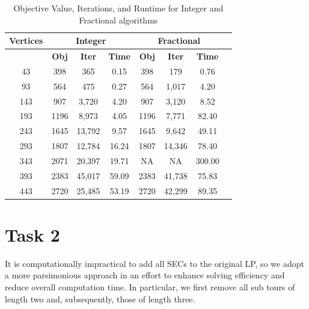 \documentclass[12pt]{article}
\numberwithin{equation}{section}
\begin{document}
\vspace{1em}
\begin{table}[!ht]
\centering
\begin{tabular}{|c|c|c|c|c|c|c|c|}
\hline
\textbf{Vertices} & \multicolumn{3}{c|}{\textbf{Integer}} & \multicolumn{3}{c|}{\textbf{Fractional}} \\
\hline
 & \textbf{Obj} & \textbf{Iter} & \textbf{Time} & \textbf{Obj} & \textbf{Iter} & \textbf{Time} \\
\hline
      43 &           398 &            365 &           0.15 &              398 &               179 &              0.76 \\
      93 &           564 &            475 &           0.27 &              564 &             1,017 &              4.20 \\
     143 &           907 &          3,720 &           4.20 &              907 &             3,120 &              8.52 \\
     193 &          1196 &          8,973 &           4.05 &             1196 &             7,771 &             82.40 \\
     243 &          1645 &         13,792 &           9.57 &             1645 &             9,642 &             49.11 \\
     293 &          1807 &         12,784 &          16.24 &             1807 &            14,346 &             78.40 \\
     343 &          2071 &         20,397 &          19.71 &                NA &                 NA &            300.00 \\
     393 &          2383 &         45,017 &          59.09 &             2383 &            41,738 &             75.83 \\
     443 &          2720 &         25,485 &          53.19 &             2720 &            42,299 &             89.35 \\
\hline
\end{tabular}
\caption{Objective Value, Iterations, and Runtime for Integer and Fractional algorithms}
\label{table:separated_comparison}
\end{table}

\vspace{1em} 

\newpage
\section{Task 2}

It is computationally impractical to add all SECs to the original LP, so we adopt a more parsimonious approach in an effort to enhance solving efficiency and reduce overall computation time. In particular, we first remove all sub tours of length two and, subsequently, those of length three.\\
\end{document}
